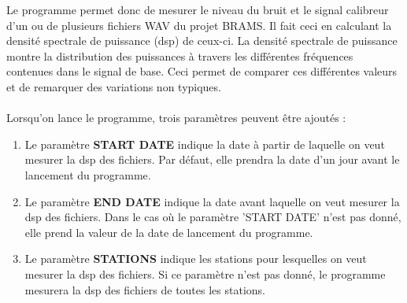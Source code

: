 \documentclass[11pt]{article}
\begin{document}
Le programme permet donc de mesurer le niveau du bruit et le signal calibreur d'un ou de plusieurs fichiers WAV du projet BRAMS.
Il fait ceci en calculant la densité spectrale de puissance (dsp) de ceux-ci.
La densité spectrale de puissance montre la distribution des puissances à travers les différentes fréquences contenues dans le signal de base.
Ceci permet de comparer ces différentes valeurs et de remarquer des variations non typiques.\\
\\
Lorsqu'on lance le programme, trois paramètres peuvent être ajoutés :
\begin{enumerate}
    \item Le paramètre \textbf{START DATE} indique la date à partir de laquelle on veut mesurer la dsp des fichiers.
          Par défaut, elle prendra la date d'un jour avant le lancement du programme.
    \item Le paramètre \textbf{END DATE} indique la date avant laquelle on veut mesurer la dsp des fichiers.
          Dans le cas où le paramètre 'START DATE' n'est pas donné, elle prend la valeur de la date de lancement du programme.
    \item Le paramètre \textbf{STATIONS} indique les stations pour lesquelles on veut mesurer la dsp des fichiers.
          Si ce paramètre n'est pas donné, le programme mesurera la dsp des fichiers de toutes les stations.
\end{enumerate}
\end{document}
